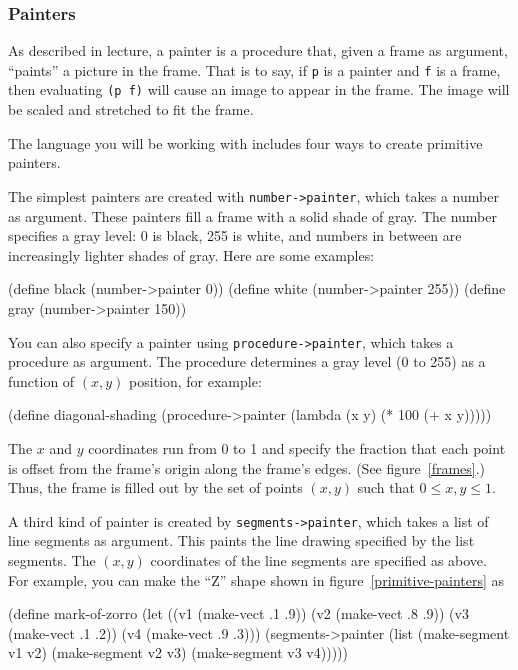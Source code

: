 \documentclass[11pt]{article}
\begin{document}
\subsubsection{Painters}

As described in lecture, a painter is a procedure that, given a frame
as argument, ``paints'' a picture in the frame.  That is to say, if
{\tt p} is a painter and {\tt f} is a frame, then evaluating {\tt (p
f)} will cause an image to appear in the frame.  The image will be
scaled and stretched to fit the frame.

The language you will be working with includes four ways to create
primitive painters.

The simplest painters are created with {\tt number->painter}, which
takes a number as argument.  These painters fill a frame with a solid
shade of gray.  The number specifies a gray level: 0 is black, 255 is
white, and numbers in between are increasingly lighter shades of
gray.  Here are some examples:

\beginlisp
(define black (number->painter 0))
(define white (number->painter 255))
(define gray (number->painter 150))
\endlisp

\noindent
You can also specify a painter using {\tt procedure->painter}, which
takes a procedure as argument.  The procedure determines a gray level
(0 to 255) as a function of $(x,y)$ position, for example:

\beginlisp
(define diagonal-shading
  (procedure->painter (lambda (x y) (* 100 (+ x y)))))
\endlisp

\noindent
The $x$ and $y$ coordinates run from 0 to 1 and specify the fraction
that each point is offset from the frame's origin along the frame's
edges.  (See figure~\ref{frames}.) Thus, the frame is filled out by
the set of points $(x,y)$ such that $0\leq x,y \leq 1$.

A third kind of painter is created by {\tt segments->painter}, which
takes a list of line segments as argument.  This paints the line
drawing specified by the list segments.  The $(x,y)$ coordinates of
the line segments are specified as above.  For example, you can make
the ``Z'' shape shown in figure~\ref{primitive-painters} as

\beginlisp
(define mark-of-zorro
  (let ((v1 (make-vect .1 .9))
        (v2 (make-vect .8 .9))
        (v3 (make-vect .1 .2))
        (v4 (make-vect .9 .3)))
    (segments->painter
     (list (make-segment v1 v2)
           (make-segment v2 v3)
           (make-segment v3 v4)))))
\endlisp
\end{document}
